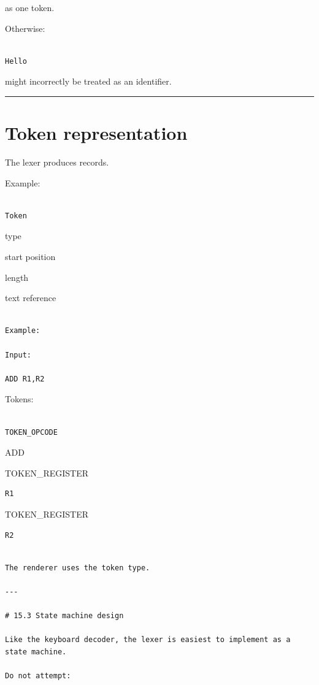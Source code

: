 \documentclass[
  oneside,
  openany]{book}
\begin{document}
as one token.

Otherwise:

\begin{verbatim}

Hello
\end{verbatim}

might incorrectly be treated as an identifier.

\begin{center}\rule{0.5\linewidth}{0.5pt}\end{center}

\hypertarget{token-representation}{%
\section{Token representation}\label{token-representation}}

The lexer produces records.

Example:

\begin{verbatim}

Token
\end{verbatim}

type

start position

length

text reference 

\begin{verbatim}

Example:

Input:

ADD R1,R2
\end{verbatim}

Tokens:

\begin{verbatim}

TOKEN_OPCODE
\end{verbatim}

ADD 

TOKEN\_REGISTER

\begin{verbatim}
R1
\end{verbatim}

TOKEN\_REGISTER

\begin{verbatim}
R2
\end{verbatim}

\begin{verbatim}

The renderer uses the token type.

---

# 15.3 State machine design

Like the keyboard decoder, the lexer is easiest to implement as a state machine.

Do not attempt:
\end{verbatim}
\end{document}
